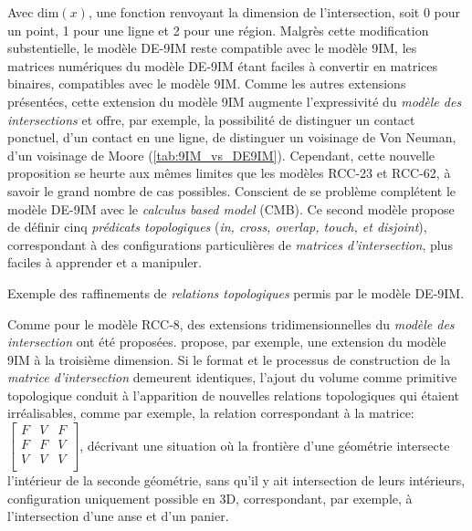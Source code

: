 Avec \(\text{dim}(x)\), une fonction renvoyant la dimension de
l'intersection, soit 0 pour un point, 1 pour une ligne et 2 pour une
région. Malgrès cette modification substentielle, le modèle DE-9IM
reste compatible avec le modèle 9IM, les matrices numériques du modèle
DE-9IM étant faciles à convertir en matrices binaires, compatibles
avec le modèle 9IM. Comme les autres extensions présentées, cette
extension du modèle 9IM augmente l'expressivité du \emph{modèle des
  intersections} et offre, par exemple, la possibilité de distinguer
un contact ponctuel, d'un contact en une ligne, \ie de distinguer un
voisinage de Von Neuman, d'un voisinage de Moore
(\autoref{tab:9IM_vs_DE9IM}). Cependant, cette nouvelle proposition se
heurte aux mêmes limites que les modèles RCC-23 et RCC-62, à savoir le
grand nombre de cas possibles. Conscient de se problème
\textcite{Clementini1993} complétent le modèle DE-9IM avec le
\emph{calculus based model} (CMB). Ce second modèle propose de définir
cinq \emph{prédicats topologiques} (\emph{in, cross, overlap, touch,
  et disjoint}), correspondant à des configurations particulières de
\emph{matrices d'intersection}, plus faciles à apprender et a
manipuler.

\begin{table}
  \centering
  
  \caption{Exemple des raffinements de \emph{relations topologiques}
    permis par le modèle DE-9IM.}
  \label{tab:9IM_vs_DE9IM}
\end{table}

Comme pour le modèle RCC-8, des extensions tridimensionnelles du
\emph{modèle des intersection} ont été
proposées. \textcite{DelaLosa2000} propose, par exemple, une extension
du modèle 9IM à la troisième dimension. Si le format et le processus
de construction de la \emph{matrice d'intersection} demeurent
identiques, l'ajout du volume comme primitive topologique conduit à
l'apparition de nouvelles relations topologiques qui étaient
irréalisables, comme par exemple, la relation correspondant à la
matrice: 
%
\(\left[
  \begin{smallmatrix}
    F&V&F\\
    F&F&V\\
    V&V&V\\
  \end{smallmatrix}
\right]\),
%
décrivant une situation où la frontière d'une géométrie intersecte
l'intérieur de la seconde géométrie, sans qu'il y ait intersection de
leurs intérieurs, configuration uniquement possible en 3D,
correspondant, par exemple, à l'intersection d'une anse et d'un
panier.

